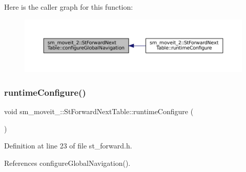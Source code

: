 Here is the caller graph for this function\+:
\nopagebreak
\begin{figure}[H]
\begin{center}
\leavevmode
\includegraphics[width=350pt]{structsm__moveit__2_1_1StForwardNextTable_a79b062960dd4f3b75464f3e47b87d79c_icgraph}
\end{center}
\end{figure}
\mbox{\label{structsm__moveit__2_1_1StForwardNextTable_a313f56151794669eb8bebc1cc6a81014}} 
\subsubsection{\texorpdfstring{runtime\+Configure()}{runtimeConfigure()}}
{\footnotesize\ttfamily void sm\+\_\+moveit\+\_\+::\+St\+Forward\+Next\+Table\+::runtime\+Configure (\begin{DoxyParamCaption}{ }\end{DoxyParamCaption})\hspace{0.3cm}{\ttfamily [inline]}}



Definition at line 23 of file st\+\_\+forward.\+h.



References configure\+Global\+Navigation().


